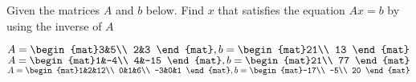 
\begin{Exercise}[
name={},
title={}, 
difficulty=0,
origin={\cite{GH}}]
Given the matrices $A$ and $b$ below. Find $x$ that satisfies the equation $Ax=b$ by using the inverse of $A$
\begin{multicols}{2}
\Question $A=\begin{mat}3&5\\  2&3 \end{mat},\\ b=\begin{mat}21\\  13 \end{mat}$
\Question $A=\begin{mat}1&-4\\  4&-15 \end{mat},\\ b=\begin{mat}21\\  77 \end{mat}$\newpage
\Question $A=\begin{mat}1&2&12\\  0&1&6\\  -3&0&1 \end{mat},\\ b=\begin{mat}-17\\  -5\\  20 \end{mat}$

\end{multicols}
\end{Exercise}
